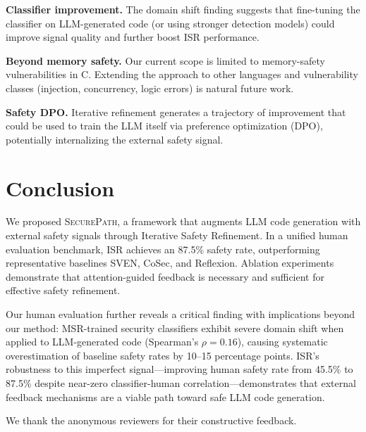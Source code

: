 \documentclass[sigconf,10pt]{acmart}
\begin{document}
\textbf{Classifier improvement.} The domain shift finding suggests that fine-tuning the classifier on LLM-generated code (or using stronger detection models) could improve signal quality and further boost ISR performance.

\textbf{Beyond memory safety.} Our current scope is limited to memory-safety vulnerabilities in C. Extending the approach to other languages and vulnerability classes (injection, concurrency, logic errors) is natural future work.

\textbf{Safety DPO.} Iterative refinement generates a trajectory of improvement that could be used to train the LLM itself via preference optimization (DPO), potentially internalizing the external safety signal.

\section{Conclusion}

We proposed \textsc{SecurePath}, a framework that augments LLM code generation with external safety signals through Iterative Safety Refinement. In a unified human evaluation benchmark, ISR achieves an 87.5\% safety rate, outperforming representative baselines SVEN, CoSec, and Reflexion. Ablation experiments demonstrate that attention-guided feedback is necessary and sufficient for effective safety refinement.

Our human evaluation further reveals a critical finding with implications beyond our method: MSR-trained security classifiers exhibit severe domain shift when applied to LLM-generated code (Spearman's $\rho=0.16$), causing systematic overestimation of baseline safety rates by 10--15 percentage points. ISR's robustness to this imperfect signal---improving human safety rate from 45.5\% to 87.5\% despite near-zero classifier-human correlation---demonstrates that external feedback mechanisms are a viable path toward safe LLM code generation.

\begin{acks}
We thank the anonymous reviewers for their constructive feedback.
\end{acks}
\end{document}

